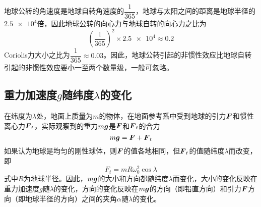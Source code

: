 地球公转的角速度是地球自转角速度的$\dfrac{1}{365}$，地球与太阳之间的距离是地球半径的$\num{2.5e4}$倍，因此地球公转的向心力与地球自转的向心力之比为
\begin{equation*}
	\left(\frac{1}{365}\right)^2 \times \num{2.5e4} \approx 0.2
\end{equation*}
Coriolis力大小之比为$\dfrac{1}{365} \approx 0.03$。因此，地球公转引起的非惯性效应比地球自转引起的非惯性效应要小一至两个数量级，一般可忽略。

\subsection{重力加速度$g$随纬度$\lambda$的变化}

在纬度为$\lambda$处，地面上质量为$m$的物体，在地面参考系中受到地球的引力$\boldsymbol{F}$和惯性离心力$\boldsymbol{F}_t$，实际观察到的重力$m\boldsymbol{g}$是$\boldsymbol{F}$和$\boldsymbol{F}_t$的合力
\begin{equation*}
	m\boldsymbol{g} = \boldsymbol{F}+\boldsymbol{F}_t
\end{equation*}
如果认为地球是均匀的刚性球体，则$\boldsymbol{F}$的值各地相同，但$\boldsymbol{F}_t$的值随纬度$\lambda$而改变，即
\begin{equation}
	F_t = mR\omega_0^2 \cos \lambda
	\label{地球上惯性离心力的大小}
\end{equation}
式中$R$为地球半径。因此，$m\boldsymbol{g}$的大小和方向都随纬度$\lambda$而变化，大小的变化反映在重力加速度$g$随$\lambda$的变化，方向的变化反映在$m\boldsymbol{g}$的方向（即铅直方向）和引力$\boldsymbol{F}$方向（即地球半径的方向）之间的夹角$\alpha$随$\lambda$的变化。

